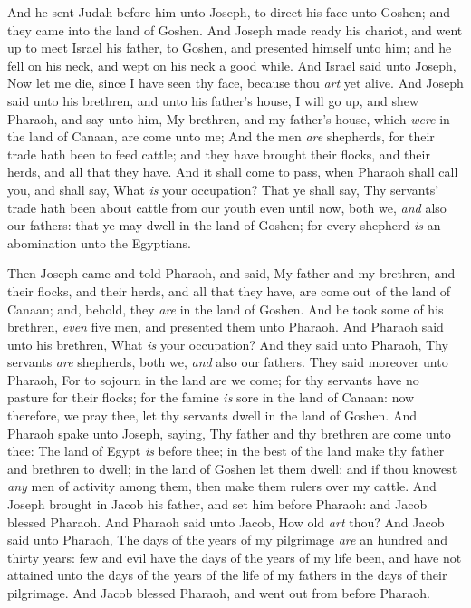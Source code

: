 \documentclass[11pt,letterpaper,oneside]{memoir}
\begin{document}
And he sent Judah before him unto Joseph, to direct his face unto
Goshen; and they came into the land of Goshen. And Joseph made ready his
chariot, and went up to meet Israel his father, to Goshen, and presented
himself unto him; and he fell on his neck, and wept on his neck a good
while. And Israel said unto Joseph, Now let me die, since I have seen
thy face, because thou \emph{art} yet alive. And Joseph said unto his
brethren, and unto his father's house, I will go up, and shew Pharaoh,
and say unto him, My brethren, and my father's house, which \emph{were}
in the land of Canaan, are come unto me; And the men \emph{are}
shepherds, for their trade hath been to feed cattle; and they have
brought their flocks, and their herds, and all that they have. And it
shall come to pass, when Pharaoh shall call you, and shall say, What
\emph{is} your occupation? That ye shall say, Thy servants' trade hath
been about cattle from our youth even until now, both we, \emph{and}
also our fathers: that ye may dwell in the land of Goshen; for every
shepherd \emph{is} an abomination unto the Egyptians.

Then Joseph came and told Pharaoh, and said, My father and my brethren,
and their flocks, and their herds, and all that they have, are come out
of the land of Canaan; and, behold, they \emph{are} in the land of
Goshen. And he took some of his brethren, \emph{even} five men, and
presented them unto Pharaoh. And Pharaoh said unto his brethren, What
\emph{is} your occupation? And they said unto Pharaoh, Thy servants
\emph{are} shepherds, both we, \emph{and} also our fathers. They said
moreover unto Pharaoh, For to sojourn in the land are we come; for thy
servants have no pasture for their flocks; for the famine \emph{is} sore
in the land of Canaan: now therefore, we pray thee, let thy servants
dwell in the land of Goshen. And Pharaoh spake unto Joseph, saying, Thy
father and thy brethren are come unto thee: The land of Egypt \emph{is}
before thee; in the best of the land make thy father and brethren to
dwell; in the land of Goshen let them dwell: and if thou knowest
\emph{any} men of activity among them, then make them rulers over my
cattle. And Joseph brought in Jacob his father, and set him before
Pharaoh: and Jacob blessed Pharaoh. And Pharaoh said unto Jacob, How old
\emph{art} thou? And Jacob said unto Pharaoh, The days of the years of
my pilgrimage \emph{are} an hundred and thirty years: few and evil have
the days of the years of my life been, and have not attained unto the
days of the years of the life of my fathers in the days of their
pilgrimage. And Jacob blessed Pharaoh, and went out from before Pharaoh.
\end{document}
